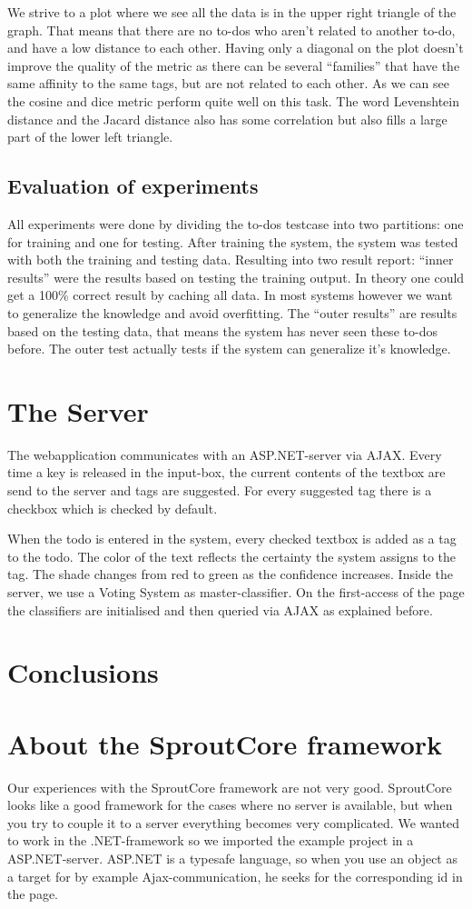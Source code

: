 \documentclass[a4paper,titlepage]{article}
\begin{document}
We strive to a plot where we see all the data is in the upper right triangle of the graph. That means that there are no to-dos who aren't related to another to-do, and have a low distance to each other. Having only a diagonal on the plot doesn't improve the quality of the metric as there can be several ``families'' that have the same affinity to the same tags, but are not related to each other. As we can see the cosine and dice metric perform quite well on this task. The word Levenshtein distance and the Jacard distance also has some correlation but also fills a large part of the lower left triangle.
\subsection{Evaluation of experiments}
All experiments were done by dividing the to-dos testcase into two partitions: one for training and one for testing. After training the system, the system was tested with both the training and testing data. Resulting into two result report: ``inner results'' were the results based on testing the training output. In theory one could get a 100\% correct result by caching all data. In most systems however we want to generalize the knowledge and avoid overfitting. The ``outer results'' are results based on the testing data, that means the system has never seen these to-dos before. The outer test actually tests if the system can generalize it's knowledge.
\section{The Server}
The webapplication communicates with an ASP.NET-server via AJAX. Every time a key is released in the input-box, the current contents of the textbox are send to the server and tags are suggested. For every suggested tag there is a checkbox which is checked by default. 

When the todo is entered in the system, every checked textbox is added as a tag to the todo. The color of the text reflects the certainty the system assigns to the tag. The shade changes from red to green as the confidence increases.
Inside the server, we use a Voting System as master-classifier. On the first-access of the page the classifiers are initialised and then queried via AJAX as explained before. 
\section{Conclusions}
\section{About the SproutCore framework}
Our experiences with the SproutCore framework are not very good. SproutCore looks like a good framework for the cases where no server is available, but when you try to couple it to a server everything becomes very complicated. We wanted to work in the .NET-framework so we imported the example project in a ASP.NET-server. ASP.NET is a typesafe language, so when you use an object as a target for by example Ajax-communication, he seeks for the corresponding id in the page. 
\end{document}
